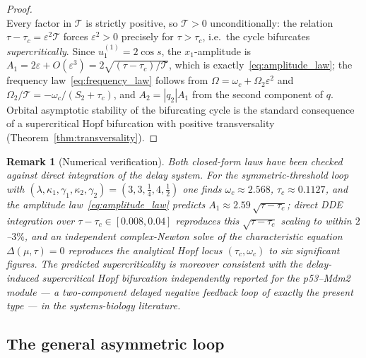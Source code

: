 \documentclass[sn-mathphys,Numbered]{sn-jnl}
\theoremstyle{thmstyleone}
\theoremstyle{thmstyletwo}
\theoremstyle{thmstylethree}
\newtheorem{remark}{Remark}
\begin{document}
\begin{proof}
\[\]
Every factor in $\mathcal{T}$ is strictly positive, so $\mathcal{T}>0$ unconditionally:
the relation $\tau-\tau_c=\varepsilon^{2}\mathcal{T}$ forces $\varepsilon^{2}>0$
precisely for $\tau>\tau_c$, i.e.\ the cycle bifurcates
\emph{supercritically}. Since $u_1^{(1)}=2\cos s$, the $x_1$-amplitude is
$A_1=2\varepsilon+O(\varepsilon^{3})=2\sqrt{(\tau-\tau_c)/\mathcal{T}}$, which is
exactly~\eqref{eq:amplitude_law}; the frequency law~\eqref{eq:frequency_law}
follows from $\Omega=\omega_c+\Omega_2\varepsilon^{2}$ and
$\Omega_2/\mathcal{T}=-\omega_c/(S_2+\tau_c)$, and $A_2=|q_2|A_1$ from the second
component of $q$. Orbital asymptotic stability of the bifurcating cycle
is the standard consequence of a supercritical Hopf bifurcation with
positive transversality (Theorem~\ref{thm:transversality}).
\end{proof}

\begin{remark}[Numerical verification]
\label{rem:supercrit_verification}
Both closed-form laws have been checked against direct integration of
the delay system. For the symmetric-threshold loop with
$(\lambda,\kappa_1,\gamma_1,\kappa_2,\gamma_2)=(3,3,\tfrac14,4,\tfrac12)$
one finds $\omega_c\approx2.568$, $\tau_c\approx0.1127$, and the
amplitude law~\eqref{eq:amplitude_law} predicts
$A_1\approx2.59\,\sqrt{\tau-\tau_c}$; direct DDE integration over
$\tau-\tau_c\in[0.008,0.04]$ reproduces this $\sqrt{\tau-\tau_c}$ scaling
to within $2$--$3\%$, and an independent complex-Newton solve of the
characteristic equation $\Delta(\mu,\tau)=0$ reproduces the analytical
Hopf locus $(\tau_c,\omega_c)$ to six significant figures. The
predicted supercriticality is moreover consistent with the
delay-induced \emph{supercritical} Hopf bifurcation independently
reported for the p53--Mdm2 module --- a two-component delayed negative
feedback loop of exactly the present type --- in the systems-biology
literature.
\end{remark}

\subsection{The general asymmetric loop}
\label{sec:general_supercrit}
\end{document}
